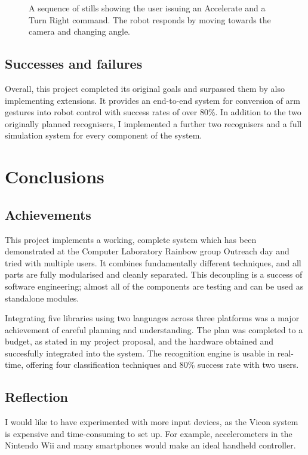\documentclass[12pt,a4,notitlepage]{report}
\renewcommand{\_}{\texttt{\symbol{95}}}
\newcommand{\<}{\texttt{\symbol{60}}}
\renewcommand{\>}{\texttt{\symbol{62}}}
\begin{document}
\begin{figure}
\caption{A sequence of stills showing the user issuing an Accelerate and a Turn Right command. The robot responds by moving towards the camera and changing angle.}
\label{driving}
\end{figure}
\section{Successes and failures}

Overall, this project completed its original goals and surpassed them by also implementing extensions. It provides an end-to-end system for conversion of arm gestures into robot control with success rates of over 80\%. In addition to the two originally planned recognisers, I implemented a further two recognisers and a full simulation system for every component of the system.

\chapter{Conclusions}

\section{Achievements}

This project implements a working, complete system which has been demonstrated at the Computer Laboratory Rainbow group Outreach day and tried with multiple users. It combines fundamentally different techniques, and all parts are fully modularised and cleanly separated. This decoupling is a success of software engineering; almost all of the components are testing and can be used as standalone modules.

Integrating five libraries using two languages across three platforms was a major achievement of careful planning and understanding. The plan was completed to a budget, as stated in my project proposal, and the hardware obtained and succesfully integrated into the system. The recognition engine is usable in real-time, offering four classification techniques and 80\% success rate with two users.

\section{Reflection}

I would like to have experimented with more input devices, as the Vicon system is expensive and time-consuming to set up. For example, accelerometers in the Nintendo Wii and many smartphones would make an ideal handheld controller.
\end{document}
